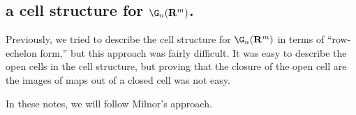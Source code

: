 \documentclass{amsart}
\begin{document}
\subsection*{a cell structure for $\G_{n}(\R^{m})$.}
Previously, we tried to describe the cell structure for
$\G_{n}(\R^{m})$ in terms of ``row-echelon form,'' but this approach
was fairly difficult. It was easy to describe the open 
cells in the cell structure, but proving that the closure of the open
cell are the images of maps out of a closed cell was not easy.

In these notes, we will follow Milnor's approach. 
\end{document}
